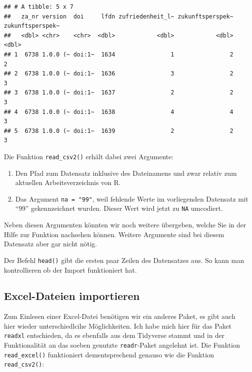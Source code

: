 \documentclass[
]{book}
\begin{document}
\begin{verbatim}
## # A tibble: 5 x 7
##   za_nr version  doi     lfdn zufriedenheit_l~ zukunftsperspek~ zukunftsperspek~
##   <dbl> <chr>    <chr>  <dbl>            <dbl>            <dbl>            <dbl>
## 1  6738 1.0.0 (~ doi:1~  1634                1                2                2
## 2  6738 1.0.0 (~ doi:1~  1636                3                2                3
## 3  6738 1.0.0 (~ doi:1~  1637                2                2                3
## 4  6738 1.0.0 (~ doi:1~  1638                4                4                3
## 5  6738 1.0.0 (~ doi:1~  1639                2                2                3
\end{verbatim}

Die Funktion \texttt{read\_csv2()} erhält dabei zwei Argumente:

\begin{enumerate}
\def\labelenumi{\arabic{enumi}.}
\item
  Den Pfad zum Datensatz inklusive des Dateinamens und zwar relativ zum aktuellen Arbeitsverzeichnis von R.
\item
  Das Argument \texttt{na\ =\ "99"}, weil fehlende Werte im vorliegenden Datensatz mit ``99'' gekennzeichnet wurden. Dieser Wert wird jetzt zu \texttt{NA} umcodiert.
\end{enumerate}

Neben diesen Argumenten könnten wir noch weitere übergeben, welche Sie in der Hilfe zur Funktion nachsehen können. Weitere Argumente sind bei diesem Datensatz aber gar nicht nötig.

Der Befehl \texttt{head()} gibt die ersten paar Zeilen des Datensatzes aus. So kann man kontrollieren ob der Import funktioniert hat.

\hypertarget{excel-dateien-importieren}{%
\subsection{Excel-Dateien importieren}\label{excel-dateien-importieren}}

Zum Einlesen einer Excel-Datei benötigen wir ein anderes Paket, es gibt auch hier wieder unterschiedlcihe Möglichkeiten. Ich habe mich hier für das Paket \texttt{readxl} entschieden, da es ebenfalls aus dem Tidyverse stammt und in der Funktionalität an das soeben genutzte \texttt{readr}-Paket angelehnt ist. Die Funktion \texttt{read\_excel()} funktioniert dementsprechend genauso wie die Funktion \texttt{read\_csv2()}:
\end{document}
